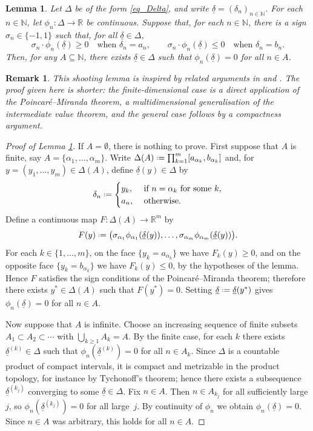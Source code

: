 \documentclass[a4paper, 11pt, reqno]{amsart}
\numberwithin{equation}{section}
\theoremstyle{plain}
\newtheorem{lemma}[theorem]{Lemma}
\newcommand*{\defeq}{\mathrel{\vcenter{\baselineskip0.5ex \lineskiplimit0pt
 \hbox{\scriptsize.}\hbox{\scriptsize.}}}=}
\newtheorem*{remark}{Remark}%
\theoremstyle{remark}
\newcommand{\R}{{\mathbb{R}}}
\newcommand{\N}{{\mathbb{N}}}
\newcommand{\uldelta}{\underline{\delta}}
\begin{document}
\begin{lemma}\label{lem:shooting}
Let $\Delta$ be of the form \eqref{eq_Delta}, and write $\uldelta=(\delta_n)_{n\in\N}$. For each $n\in \N$, let $\phi_n\colon \Delta\to \R$ be continuous. Suppose that, for each \(n\in\N\), there is a sign $\sigma_n\in\{-1,1\}$ such that, for all $\uldelta\in\Delta$,
	\[\sigma_n\cdot\phi_n(\uldelta)\geq0\quad\text{when }\delta_n=a_n,\qquad
		\sigma_n\cdot\phi_n(\uldelta)\leq0\quad\text{when }\delta_n=b_n.
	\]
Then, for any $A\subseteq \N$, there exists $\uldelta \in \Delta$ such that $\phi_n(\uldelta)=0$ for all $n\in A$.
\end{lemma}

\begin{remark}\normalfont
		This shooting lemma is inspired by related arguments in
		\cite[Lemma~4.6]{letidave_variations} and
		\cite[Proof of Theorem~7.4]{lasse_model14}. 
		The proof given here is shorter: the finite-dimensional case is
		a direct application of the Poincar\'e--Miranda theorem, a
		multidimensional generalisation of the intermediate value theorem,
		and the general case follows by a compactness argument.
\end{remark}

\begin{proof}[Proof of Lemma \ref{lem:shooting}]
If $A=\emptyset$, there is nothing to prove. First suppose that $A$ is finite, say $A=\{\alpha_1,\ldots,\alpha_m\}$.
	Write $\Delta(A)\defeq \prod_{k=1}^m [a_{\alpha_k},b_{\alpha_k}]$ and, for
	$y=(y_1,\ldots,y_m)\in \Delta(A)$, define $\uldelta(y)\in\Delta$ by
	\[
	\delta_n \defeq
	\begin{cases}
		y_k, &\text{ if } n = \alpha_k \text{ for some } k,\\
		a_n, &\text{ otherwise.}
	\end{cases}
	\]
	Define a continuous map $F\colon \Delta(A)\to \R^m$ by
	\[
	F(y)\defeq \big(\sigma_{\alpha_1}\phi_{\alpha_1}(\uldelta(y)),\ldots,
		\sigma_{\alpha_m}\phi_{\alpha_m}(\uldelta(y))\big).
	\]
	For each $k\in\{1,\ldots,m\}$, on the face $\{y_k=a_{\alpha_k}\}$ we have $F_k(y)\geq0$, and on the opposite face $\{y_k=b_{\alpha_k}\}$ we have $F_k(y)\leq0$,
	by the hypotheses of the lemma. Hence $F$ satisfies the sign conditions of the
	Poincar\'e--Miranda theorem; therefore there exists $y^*\in\Delta(A)$ such that
	$F(y^*)=0$. Setting $\uldelta\defeq \uldelta(y^*)$ gives $\phi_n(\uldelta)=0$ for all
	$n\in A$.
	
	Now suppose that $A$ is infinite. Choose an increasing sequence of finite subsets
	$A_1\subset A_2\subset\cdots$ with $\bigcup_{k\ge1}A_k=A$. By the finite case, for each
	$k$ there exists $\uldelta^{(k)}\in\Delta$ such that $\phi_n(\uldelta^{(k)})=0$ for all
	$n\in A_k$. Since $\Delta$ is a countable product of compact intervals, it is compact and metrizable in the product topology, for instance by Tychonoff's theorem; hence
	there exists a subsequence $\uldelta^{(k_j)}$ converging to some $\uldelta\in\Delta$.
	Fix $n\in A$. Then $n\in A_{k_j}$ for all sufficiently large $j$, so
	$\phi_n(\uldelta^{(k_j)})=0$ for all large~$j$. By continuity of $\phi_n$ we obtain
	$\phi_n(\uldelta)=0$. Since $n\in A$ was arbitrary, this holds for all $n\in A$.
\end{proof}
\end{document}
